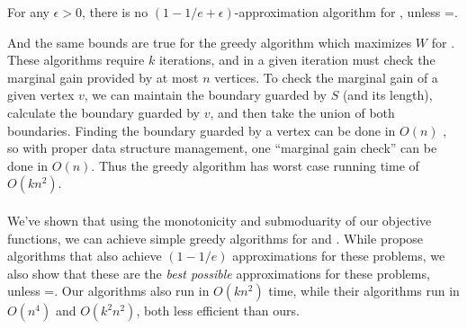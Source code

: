 \begin{theorem}
    For any $\epsilon>0$, there is no $(1-1/e+\epsilon)$-approximation algorithm for \MLVG{}, unless =.
\end{theorem}
\noindent
And the same bounds are true for the greedy algorithm which maximizes $W$ for \MVVG{}. These algorithms require $k$ iterations, and in a given iteration must check the marginal gain provided by at most $n$ vertices. To check the marginal gain of a given vertex $v$, we can maintain the boundary guarded by $S$ (and its length), calculate the boundary guarded by $v$, and then take the union of both boundaries. Finding the boundary guarded by a vertex can be done in $O(n)$ \cite{visibility}, so with proper data structure management, one ``marginal gain check'' can be done in $O(n)$. Thus the greedy algorithm has worst case running time of $O(kn^2)$. \\\\
We've shown that using the monotonicity and submoduarity of our objective functions, we can achieve simple greedy algorithms for \MLVG{} and \MVVG{}. While \cite{fragoudakis-boundary,fragoudakis-interior,fragoudakis-paintings} propose algorithms that also achieve $(1-1/e)$ approximations for these problems, we also show that these are the \emph{best possible} approximations for these problems, unless =. Our algorithms also run in $O(kn^2)$ time, while their algorithms run in $O(n^4)$ and $O(k^2n^2)$, both less efficient than ours.
